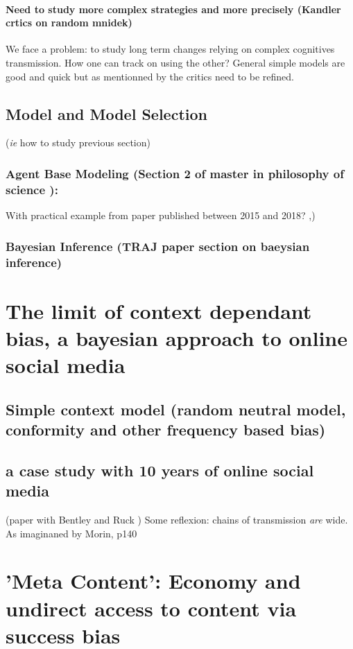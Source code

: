 \documentclass[12pt, b5paper,twoside]{tesi_upf}
\begin{document}
\subsubsection{ Need to study more complex strategies and more precisely (Kandler crtics on random mnidek)}
We face a problem: to study long term changes relying on complex cognitives transmission. How one can track on using the other? General simple models are good and quick but as mentionned by the critics need to be refined.
\section{ Model and Model Selection} (\emph{ie} how to study previous section)
\subsection{ Agent Base Modeling (Section 2 of master in philosophy of science \cite{carrignon2016modelandsimulaion}): }
With practical example from paper published between 2015 and 2018? \cite{montanier2016behavioralspecializationinembodiedevolutionaryroboticswhysodifficult},\cite{zibetti2015acaciaesanagentbasedmodelingandsimulationtoolforinvestigatingsocialbehaviorsinresourcelimitedtwodimensionalenvironments}\cite{medernach2016evolution})
\subsection{ Bayesian Inference (TRAJ paper section on baeysian inference)}
\chapter{ The limit of context dependant bias, a bayesian approach to online social media}
\section{ Simple context model (random neutral model, conformity and other frequency based bias)}
\section{ a case study with 10 years of online social media} (paper with Bentley and Ruck \cite{carrignon2018})
Some reflexion: chains of transmission \emph{are} wide. As imaginaned by Morin, p140
\chapter{'Meta Content': Economy and undirect access to content via success bias}
\end{document}
